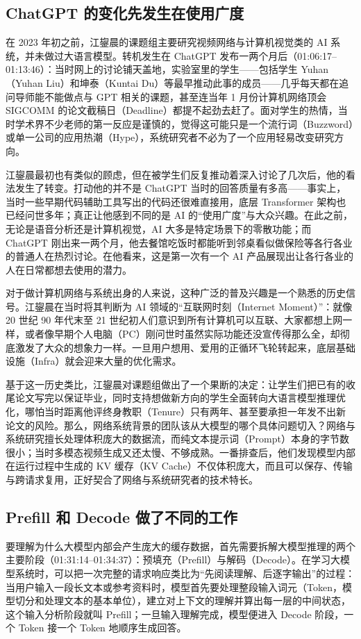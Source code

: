 \documentclass[UTF8,a4paper,11pt,fontset=fandol]{ctexart}
\begin{document}
\subsection{ChatGPT 的变化先发生在使用广度}
在 2023 年初之前，江鋆晨的课题组主要研究视频网络与计算机视觉类的 AI 系统，并未做过大语言模型。转机发生在 ChatGPT 发布一两个月后（01:06:17–01:13:46）：当时网上的讨论铺天盖地，实验室里的学生——包括学生 Yuhan（Yuhan Liu）和坤泰（Kuntai Du）等最早推动此事的成员——几乎每天都在追问导师能不能做点与 GPT 相关的课题，甚至连当年 1 月份计算机网络顶会 SIGCOMM 的论文截稿日（Deadline）都提不起劲去赶了。面对学生的热情，当时学术界不少老师的第一反应是谨慎的，觉得这可能只是一个流行词（Buzzword）或单一公司的应用热潮（Hype），系统研究者不必为了一个应用轻易改变研究方向。

江鋆晨最初也有类似的顾虑，但在被学生们反复推动着深入讨论了几次后，他的看法发生了转变。打动他的并不是 ChatGPT 当时的回答质量有多高——事实上，当时一些早期代码辅助工具写出的代码还很难直接用，底层 Transformer 架构也已经问世多年；真正让他感到不同的是 AI 的“使用广度”与大众兴趣。在此之前，无论是语音分析还是计算机视觉，AI 大多是特定场景下的零散功能；而 ChatGPT 刚出来一两个月，他去餐馆吃饭时都能听到邻桌看似做保险等各行各业的普通人在热烈讨论。在他看来，这是第一次有一个 AI 产品展现出让各行各业的人在日常都想去使用的潜力。

对于做计算机网络与系统出身的人来说，这种广泛的普及兴趣是一个熟悉的历史信号。江鋆晨在当时将其判断为 AI 领域的“互联网时刻（Internet Moment）”：就像 20 世纪 90 年代末至 21 世纪初人们意识到所有计算机可以互联、大家都想上网一样，或者像早期个人电脑（PC）刚问世时虽然实际功能还没宣传得那么全，却彻底激发了大众的想象力一样。一旦用户想用、爱用的正循环飞轮转起来，底层基础设施（Infra）就会迎来大量的优化需求。

基于这一历史类比，江鋆晨对课题组做出了一个果断的决定：让学生们把已有的收尾论文写完以保证毕业，同时支持想做新方向的学生全面转向大语言模型推理优化，哪怕当时距离他评终身教职（Tenure）只有两年、甚至要承担一年发不出新论文的风险。那么，网络系统背景的团队该从大模型的哪个具体问题切入？网络与系统研究擅长处理体积庞大的数据流，而纯文本提示词（Prompt）本身的字节数很小；当时多模态视频生成又还太慢、不够成熟。一番排查后，他们发现模型内部在运行过程中生成的 KV 缓存（KV Cache）不仅体积庞大，而且可以保存、传输与跨请求复用，正好契合了网络与系统研究者的技术特长。

\subsection{Prefill 和 Decode 做了不同的工作}
要理解为什么大模型内部会产生庞大的缓存数据，首先需要拆解大模型推理的两个主要阶段（01:31:14–01:34:37）：预填充（Prefill）与解码（Decode）。在学习大模型系统时，可以把一次完整的请求响应类比为“先阅读理解、后逐字输出”的过程：当用户输入一段长文本或参考资料时，模型首先要处理整段输入词元（Token，模型切分和处理文本的基本单位），建立对上下文的理解并算出每一层的中间状态，这个输入分析阶段就叫 Prefill；一旦输入理解完成，模型便进入 Decode 阶段，一个 Token 接一个 Token 地顺序生成回答。
\end{document}
